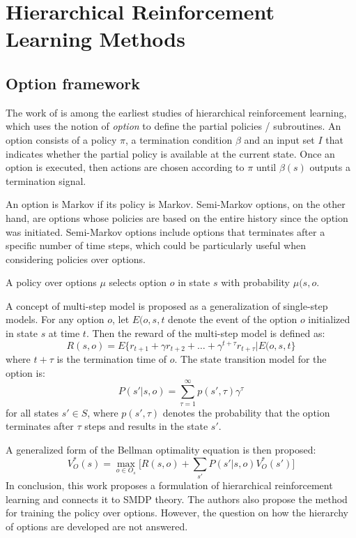 \section{Hierarchical Reinforcement Learning Methods}
\subsection{Option framework}
The work of \cite{sutton1999between} is among the earliest studies of hierarchical reinforcement learning, which uses the notion of \textit{option} to define the partial policies / subroutines. An option consists of a policy $\pi$, a termination condition $\beta$ and an input set $I$ that indicates whether the partial policy is available at the current state. Once an option is executed, then actions are chosen according to \(\pi\) until \(\beta(s)\) outputs a termination signal. 

An option is Markov if its policy is Markov. Semi-Markov options, on the other hand, are options whose policies are based on the entire history since the option was initiated. Semi-Markov options include options that terminates after a specific number of time steps, which could be particularly useful when considering policies over options.

A policy over options \(\mu \) selects option \(o\) in state \(s\) with probability \(\mu(s,o\).

A concept of multi-step model is proposed as a generalization of single-step models. For any option \(o\), let \(E(o,s,t\) denote the event of the option $o$ initialized in state $s$ at time $t$. Then the reward of the multi-step model is defined as:
\[ R(s,o)=E\{r_{t+1}+\gamma r_{t+2}+\ldots+\gamma^{t+\tau} r_{t+\tau} \lvert E(o,s,t\} \]
where $t+\tau$ is the termination time of $o$. The state transition model for the option is:
\[P(s' \lvert s,o)=\sum_{\tau=1}^{\infty} p(s',\tau) \gamma^\tau \]
for all states \(s' \in S \), where \( p(s',\tau) \) denotes the probability that the option terminates after \(\tau\) steps and results in the state \(s'\).

A generalized form of the Bellman optimality equation is then proposed:
\begin{equation}
    V_O^*(s) = \max_{o \in O_s} \big[ R(s,o)+\sum_{s'}P(s' \lvert s,o) V_O^*(s') \big]
\end{equation}
In conclusion, this work proposes a formulation of hierarchical reinforcement learning and connects it to SMDP theory. The authors also propose the method for training the policy over options. However, the question on how the hierarchy of options are developed are not answered.

